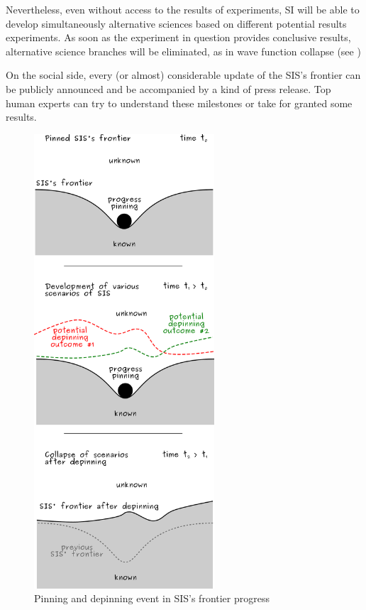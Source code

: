 \documentclass[a4paper,11pt]{article}
\begin{document}
Nevertheless, even without access to the results of experiments, SI will be able to develop simultaneously alternative sciences based on different potential results experiments. As soon as the experiment in question provides conclusive results, alternative science branches will be eliminated, as in wave function collapse (see )

On the social side, every (or almost) considerable update of the SIS's frontier can be publicly announced and be accompanied by a kind of press release. Top human experts can try to understand these milestones or take for granted some results.

\begin{figure}[ht!]
    \centering\includegraphics[width=0.6\textwidth]{depinning_2.pdf}
    \caption{\label{fig:pinning}Pinning and depinning event in SIS's frontier progress}
\end{figure}
\end{document}
